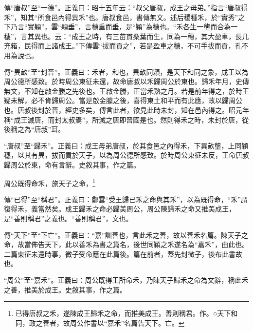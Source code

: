 {\noindent\zhuan{}\fzbyks 傳“唐叔”至“一德”。正義曰：昭十五年云：“叔父唐叔，成王之母弟。”指言“唐叔得禾”，知其“所食邑內得異禾”也。唐叔食邑，書傳無文。述后稷種禾，於“實秀”之下乃言“實穎”，雲“穎垂”，言穗重而垂，是“穎”為穗也。“禾各生一壟而合為一穗”，言其異也。云：“成王之時，有三苗貫桑葉而生，同為一穗，其大盈車，長几充箱，民得而上諸成王。”下傳雲“拔而貢之”，若是盈車之穗，不可手拔而貢，孔不用為說也。 \par}

{\noindent\zhuan{}\fzbyks 傳“異畝”至“封晉”。正義曰：禾者，和也，異畝同穎，是天下和同之象，成王以為周公德所感致。於時周公東征未還，故命唐叔以禾歸周公於東也。歸禾年月，史傳無文，不知在啟金縢之先後也。王啟金縢，正當禾熟之月。若是前年得之，於時王疑未解，必不肯歸周公。當是啟金縢之後，喜得東土和平而有此應，故以歸周公也。唐叔後封於晉，經史多矣，傳言此者，欲見此時未封，知在邑內得之。昭元年稱“成王滅唐，而封太叔焉”，所滅之唐即晉國是也。然則得禾之時，未封於唐，從後稱之為“唐叔”耳。 \par}

{\noindent\shu{}\fzkt “唐叔”至“歸禾”。正義曰：成王母弟唐叔，於其食邑之內得禾，下異畝壟，上同穎穗，以其有異，拔而貢於天子，以為周公德所感致。於時周公東征未反，王命唐叔歸周公於東，命有言辭。史敘其事，作之篇。 \par}

周公既得命禾，旅天子之命，\footnote{已得唐叔之禾，遂陳成王歸禾之命，而推美成王。善則稱君。作。○天下和同，政之善者，故周公作書以“嘉禾”名篇告天下。亡。}

{\noindent\zhuan{}\fzbyks 傳“已得”至“稱君”。正義曰：鄭雲“受王歸已禾之命與其禾”，以為既得命，“禾”謂復得禾，義當然矣。成王歸禾之命必歸美周公，周公陳歸禾之命又推美成王，是“善則稱君”之義也。“善則稱君”，文也。 \par}

{\noindent\zhuan{}\fzbyks 傳“天下”至“下亡”。正義曰：“嘉”訓善也，言此禾之善，故以善禾名篇。陳天子之命，故當佈告天下，此以善禾為書之篇名，後世同穎之禾遂名為“嘉禾”，由此也。二篇東征未還時事，微子受命應在此篇後。篇在前者，蓋先封微子，後布此書故也。 \par}

{\noindent\shu{}\fzkt “周公”至“嘉禾”。正義曰：周公既得王所命禾，乃陳天子歸禾之命為文辭，稱此禾之善，推美於成王。史敘其事，作之篇。 \par}

